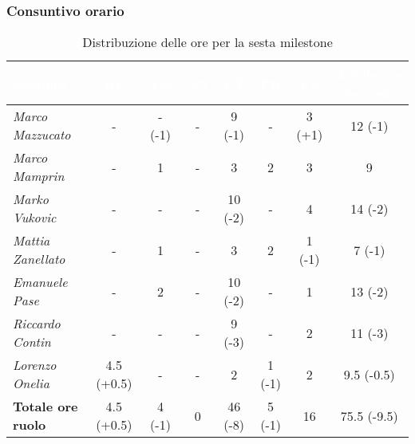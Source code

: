 \subsubsection{Consuntivo orario}
\begin{table}[H]
    \renewcommand\arraystretch{1.5}
    \small
    \centering
        \begin{tabular}{|l|c|c|c|c|c|c|c|}
            \hline
            \rowcolor[HTML]{036400}
            \textcolor{white}{\textbf{Membro}} & \multicolumn{1}{c|}{\textcolor{white}{\textbf{RE}}} & \multicolumn{1}{c|}{\textcolor{white}{\textbf{AM}}} & \multicolumn{1}{c|}{\textcolor{white}{\textbf{AN}}} & \multicolumn{1}{c|}{\textcolor{white}{\textbf{PT}}} & \multicolumn{1}{c|}{\textcolor{white}{\textbf{PR}}} & \multicolumn{1}{c|}{\textcolor{white}{\textbf{VE}}} & \multicolumn{1}{c|}{\textcolor{white}{\textbf{Totale ore persona}}} \\ \hline
            \rowcolor[HTML]{EFEFEF}\textit{Marco Mazzucato}  & -         & - (-1)     & -          & 9 (-1)     & -        & 3 (+1)   & 12 (-1)       \\ \hline
            \rowcolor[HTML]{C0C0C0}\textit{Marco Mamprin}    & -         & 1          & -          & 3          & 2        & 3        & 9       \\ \hline
            \rowcolor[HTML]{EFEFEF}\textit{Marko Vukovic}    & -         & -          & -          & 10 (-2)    & -        & 4        & 14 (-2)       \\ \hline
            \rowcolor[HTML]{C0C0C0}\textit{Mattia Zanellato} & -         & 1          & -          & 3          & 2        & 1 (-1)   & 7 (-1)       \\ \hline
            \rowcolor[HTML]{EFEFEF}\textit{Emanuele Pase}    & -         & 2          & -          & 10 (-2)    & -        & 1        & 13 (-2)       \\ \hline
            \rowcolor[HTML]{C0C0C0}\textit{Riccardo Contin}  & -         & -          & -          & 9 (-3)     & -        & 2        & 11 (-3)      \\ \hline
            \rowcolor[HTML]{EFEFEF}\textit{Lorenzo Onelia}   & 4.5 (+0.5)& -          & -          & 2          & 1 (-1)   & 2        & 9.5 (-0.5)       \\ \hline
            \rowcolor[HTML]{C0C0C0}\textbf{Totale ore ruolo} & 4.5 (+0.5)& 4 (-1)     & 0          & 46 (-8)    & 5 (-1)   & 16       & 75.5 (-9.5)       \\ \hline
        \end{tabular}
    \caption{Distribuzione delle ore per la sesta milestone}
\end{table}

